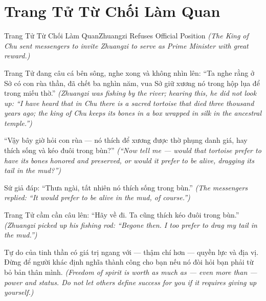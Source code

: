\section{Trang Tử Từ Chối Làm Quan}
\begin{truyen}{Trang Tử Từ Chối Làm Quan}{Zhuangzi Refuses Official Position}
\textit{(The King of Chu sent messengers to invite Zhuangzi to serve as Prime Minister with great reward.)}

Trang Tử đang câu cá bên sông, nghe xong và không nhìn lên: ``Ta nghe rằng ở Sở có con rùa thần, đã chết ba nghìn năm, vua Sở giữ xương nó trong hộp lụa để trong miếu thờ.''
\textit{(Zhuangzi was fishing by the river; hearing this, he did not look up: ``I have heard that in Chu there is a sacred tortoise that died three thousand years ago; the king of Chu keeps its bones in a box wrapped in silk in the ancestral temple.'')}

``Vậy bây giờ hỏi con rùa — nó thích để xương được thờ phụng danh giá, hay thích sống và kéo đuôi trong bùn?''
\textit{(``Now tell me — would that tortoise prefer to have its bones honored and preserved, or would it prefer to be alive, dragging its tail in the mud?'')}

Sứ giả đáp: ``Thưa ngài, tất nhiên nó thích sống trong bùn.''
\textit{(The messengers replied: ``It would prefer to be alive in the mud, of course.'')}

Trang Tử cầm cần câu lên: ``Hãy về đi. Ta cũng thích kéo đuôi trong bùn.''
\textit{(Zhuangzi picked up his fishing rod: ``Begone then. I too prefer to drag my tail in the mud.'')}

\end{truyen}

\begin{baihoc}
Tự do của tinh thần có giá trị ngang với — thậm chí hơn — quyền lực và địa vị. Đừng để người khác định nghĩa thành công cho bạn nếu nó đòi hỏi bạn phải từ bỏ bản thân mình.
\textit{(Freedom of spirit is worth as much as — even more than — power and status. Do not let others define success for you if it requires giving up yourself.)}
\end{baihoc}
\ngancach

